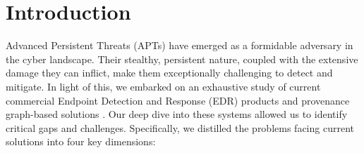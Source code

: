 \section{Introduction}
Advanced Persistent Threats (APTs) have emerged as a formidable adversary in the cyber landscape. Their stealthy, persistent nature, coupled with the extensive damage they can inflict, make them exceptionally challenging to detect and mitigate. 
In light of this, we embarked on an exhaustive study of current commercial Endpoint Detection and Response (EDR) products \cite{karantzas2021empirical} and provenance graph-based solutions \cite{cheng2023kairos,alsaheel2021atlas,han2020unicorn,inam2022sok,han2021sigl}. Our deep dive into these systems allowed us to identify critical gaps and challenges. Specifically, we distilled the problems facing current solutions into four key dimensions:

